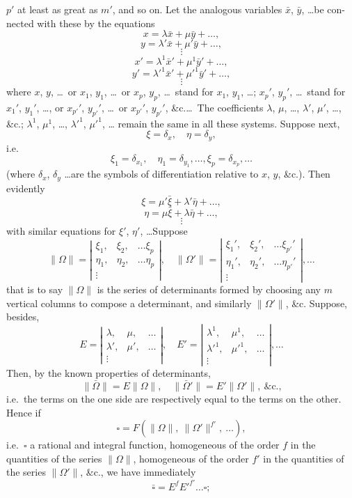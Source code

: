 \documentclass[11pt,a4paper]{article}
\theoremstyle{plain}
\theoremstyle{definition}
\theoremstyle{remark}
\begin{document}
$p'$ at least as great as $m'$, and so on. Let the analogous variables $\bar{x}$, $\bar{y}$, \ldots be con-
nected with these by the equations
\[
x = \lambda\bar{x} + \mu\bar{y} + \ldots,
\]
\[
y = \lambda'\bar{x} + \mu'\bar{y} + \ldots,
\]
\[
\vdots
\]
\[
x' = \lambda^1\bar{x}' + \mu^1\bar{y}' + \ldots,
\]
\[
y' = \lambda'^1\bar{x}' + \mu'^1\bar{y}' + \ldots,
\]
\[
\vdots
\]
where $x$, $y$, \ldots\ or $x_1$, $y_1$, \ldots\ or $x_p$, $y_p$, \ldots\ stand for $x_1$, $y_1$, \ldots; $x_p'$, $y_p'$, \ldots\ stand for $x_1'$, $y_1'$, \ldots,
or $x_{p'}'$, $y_{p'}'$, \ldots\ or $x_{p'}'$, $y_{p'}'$, \&c.\ldots\ The coefficients $\lambda$, $\mu$, \ldots, $\lambda'$, $\mu'$, \ldots, \&c.; $\lambda^1$, $\mu^1$, \ldots, $\lambda'^1$, $\mu'^1$, \ldots
remain the same in all these systems. Suppose next,
\[
\xi = \delta_x,\quad \eta = \delta_y,
\]
i.e.
\[
\xi_1 = \delta_{x_1},\quad \eta_1 = \delta_{y_1},\ldots, \xi_p = \delta_{x_p},\ldots
\]
(where $\delta_x$, $\delta_y$ \ldots are the symbols of differentiation relative to $x$, $y$, \&c.). Then evidently
\[
\xi = \mu'\bar{\xi} + \lambda'\bar{\eta} + \ldots,
\]
\[
\eta = \mu\bar{\xi} + \lambda\bar{\eta} + \ldots,
\]
\[
\vdots
\]
with similar equations for $\xi'$, $\eta'$, \ldots Suppose
\[
\|\Omega\| =
\left|
\begin{array}{ccc}
\xi_1,&\xi_2,&\ldots\xi_p \\
\eta_1,&\eta_2,&\ldots\eta_p \\
\vdots
\end{array}
\right|,
\quad
\|\Omega'\| =
\left|
\begin{array}{ccc}
\xi_1',&\xi_2',&\ldots\xi_{p'}' \\
\eta_1',&\eta_2',&\ldots\eta_{p'}' \\
\vdots
\end{array}
\right|,\ldots
\]
that is to say $\|\Omega\|$ is the series of determinants formed by choosing any $m$ vertical
columns to compose a determinant, and similarly $\|\Omega'\|$, \&c. Suppose, besides,
\[
E =
\left|
\begin{array}{ccc}
\lambda,&\mu,&\ldots \\
\lambda',&\mu',&\ldots \\
\vdots
\end{array}
\right|,
\quad
E' =
\left|
\begin{array}{ccc}
\lambda^1,&\mu^1,&\ldots \\
\lambda'^1,&\mu'^1,&\ldots \\
\vdots
\end{array}
\right|,\ldots
\]
Then, by the known properties of determinants,
\[
\|\bar{\Omega}\| = E\|\Omega\|,\quad \|\bar{\Omega}'\| = E'\|\Omega'\|,\ \&\text{c.,}
\]
i.e.\ the terms on the one side are respectively equal to the terms on the other. Hence if
\[
\square = F(\|\Omega\|,\ \|\Omega'\|^{f'},\ \ldots),
\]
i.e.\ $\square$ a rational and integral function, homogeneous of the order $f$ in the quantities
of the series $\|\Omega\|$, homogeneous of the order $f'$ in the quantities of the series $\|\Omega'\|$,
\&c., we have immediately
\[
\bar{\square} = E^f E'^{f'}\ldots\square;
\]
\end{document}

